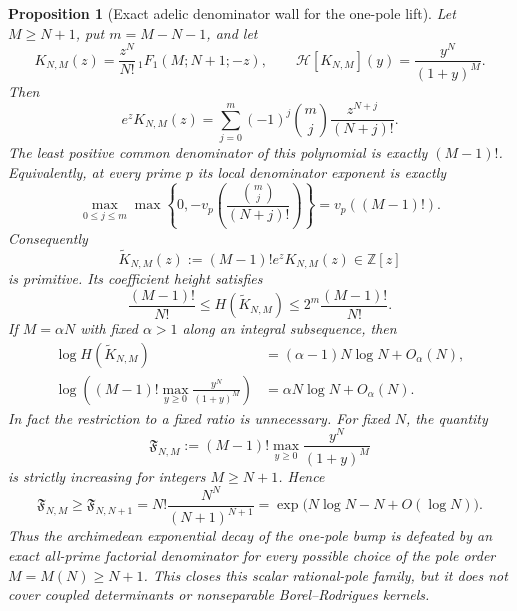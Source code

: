 \documentclass[11pt]{article}
\newtheorem{proposition}[theorem]{Proposition}
\theoremstyle{definition}
\theoremstyle{remark}
\begin{document}
\begin{proposition}[Exact adelic denominator wall for the one-pole lift]
\label{prop:borel-laguerre-adelic-wall}
Let $M\geq N+1$, put $m=M-N-1$, and let
\[
 K_{N,M}(z)=\frac{z^N}{N!}\,{}_1F_1(M;N+1;-z),
 \qquad
 \mathcal H[K_{N,M}](y)=\frac{y^N}{(1+y)^M}.
\]
Then
\begin{equation}\label{eq:borel-laguerre-clearing-expansion}
 e^zK_{N,M}(z)
 =\sum_{j=0}^{m}(-1)^j\binom mj
   \frac{z^{N+j}}{(N+j)!}.
\end{equation}
The least positive common denominator of this polynomial is exactly
$(M-1)!$.  Equivalently, at every prime $p$ its local denominator
exponent is exactly
\begin{equation}\label{eq:borel-laguerre-local-wall}
 \max_{0\leq j\leq m}
 \max\!\left\{0,-v_p\!\left(
 \frac{\binom mj}{(N+j)!}\right)\right\}
 =v_p((M-1)!).
\end{equation}
Consequently
\begin{equation}\label{eq:borel-laguerre-primitive-polynomial}
 \widetilde K_{N,M}(z):=(M-1)!e^zK_{N,M}(z)
 \in\mathbb Z[z]
\end{equation}
is primitive.  Its coefficient height satisfies
\begin{equation}\label{eq:borel-laguerre-height-bounds}
 \frac{(M-1)!}{N!}
 \leq H(\widetilde K_{N,M})
 \leq 2^m\frac{(M-1)!}{N!}.
\end{equation}
If $M=\alpha N$ with fixed $\alpha>1$ along an integral subsequence, then
\begin{align}
 \log H(\widetilde K_{N,M})
 &=(\alpha-1)N\log N+O_\alpha(N),
 \label{eq:borel-laguerre-height-asymptotic}\\
 \log\!\left((M-1)!
 \max_{y\geq0}\frac{y^N}{(1+y)^M}\right)
 &=\alpha N\log N+O_\alpha(N).
 \label{eq:borel-laguerre-normalized-bump}
\end{align}
In fact the restriction to a fixed ratio is unnecessary.  For fixed
$N$, the quantity
\[
 \mathfrak F_{N,M}:=(M-1)!
 \max_{y\geq0}\frac{y^N}{(1+y)^M}
\]
is strictly increasing for integers $M\geq N+1$.  Hence
\begin{equation}\label{eq:borel-laguerre-uniform-wall}
 \mathfrak F_{N,M}
 \geq \mathfrak F_{N,N+1}
 =N!\frac{N^N}{(N+1)^{N+1}}
 =\exp\bigl(N\log N-N+O(\log N)\bigr).
\end{equation}
Thus the archimedean exponential decay of the one-pole bump is defeated
by an exact all-prime factorial denominator for every possible choice of
the pole order $M=M(N)\geq N+1$.  This closes this scalar rational-pole
family, but it does not cover coupled determinants or nonseparable
Borel--Rodrigues kernels.
\end{proposition}
\end{document}

